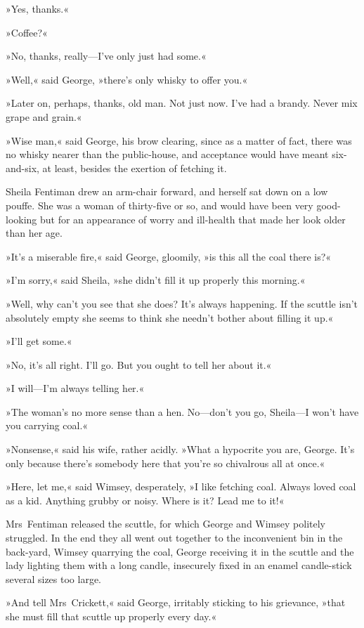 »Yes, thanks.«

»Coffee?«

»No, thanks, really—I've only just had some.«

»Well,« said George, »there's only whisky to offer you.«

»Later on, perhaps, thanks, old man. Not just now. I've had a brandy. Never mix grape and grain.«

»Wise man,« said George, his brow clearing, since as a matter of fact, there was no whisky nearer than the public-house, and acceptance would have meant six-and-six, at least, besides the exertion of fetching it.

Sheila Fentiman drew an arm-chair forward, and herself sat down on a low pouffe. She was a woman of thirty-five or so, and would have been very good-looking but for an appearance of worry and ill-health that made her look older than her age.

»It's a miserable fire,« said George, gloomily, »is this all the coal there is?«

»I'm sorry,« said Sheila, »she didn't fill it up properly this morning.«

»Well, why can't you see that she does? It's always happening. If the scuttle isn't absolutely empty she seems to think she needn't bother about filling it up.«

»I'll get some.«

»No, it's all right. I'll go. But you ought to tell her about it.«

»I will—I'm always telling her.«

»The woman's no more sense than a hen. No—don't you go, Sheila—I won't have you carrying coal.«

»Nonsense,« said his wife, rather acidly. »What a hypocrite you are, George. It's only because there's somebody here that you're so chivalrous all at once.«

»Here, let me,« said Wimsey, desperately, »I like fetching coal. Always loved coal as a kid. Anything grubby or noisy. Where is it? Lead me to it!«

Mrs~Fentiman released the scuttle, for which George and Wimsey politely struggled. In the end they all went out together to the inconvenient bin in the back-yard, Wimsey quarrying the coal, George receiving it in the scuttle and the lady lighting them with a long candle, insecurely fixed in an enamel candle-stick several sizes too large.

»And tell Mrs~Crickett,« said George, irritably sticking to his grievance, »that she must fill that scuttle up properly every day.«

